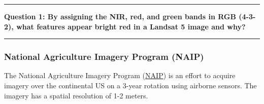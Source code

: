 \documentclass[
]{article}
\begin{document}
\begin{center}\rule{0.5\linewidth}{0.5pt}\end{center}

\textbf{Question 1: By assigning the NIR, red, and green bands in RGB (4-3-2), what features appear bright red in a Landsat 5 image and why?}

\begin{center}\rule{0.5\linewidth}{0.5pt}\end{center}

\hypertarget{national-agriculture-imagery-program-naip}{%
\subsubsection{National Agriculture Imagery Program (NAIP)}\label{national-agriculture-imagery-program-naip}}

The National Agriculture Imagery Program (\href{http://www.fsa.usda.gov/programs-and-services/aerial-photography/imagery-programs/naip-imagery/}{NAIP}) is an effort to acquire imagery over the continental US on a 3-year rotation using airborne sensors. The imagery has a spatial resolution of 1-2 meters.
\end{document}
